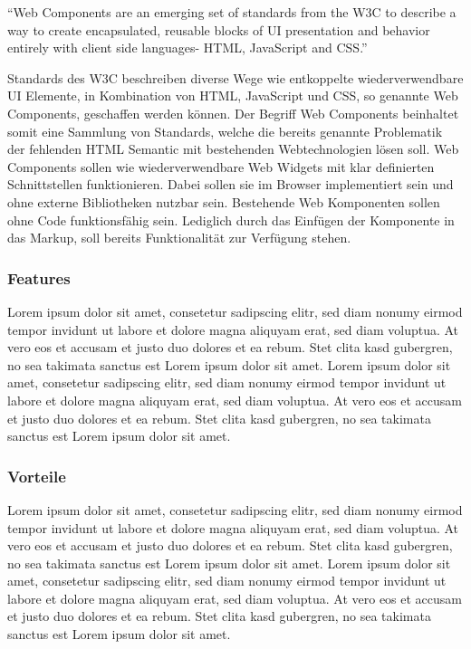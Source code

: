 ``Web Components are an emerging set of standards from the W3C to describe a way to create encapsulated,
reusable blocks of UI presentation and behavior entirely with client side languages- HTML, JavaScript and CSS.''
\cite[42]{Web-Component-Architecture}
\vspace{1cm}

Standards des W3C beschreiben diverse Wege wie entkoppelte wiederverwendbare UI Elemente,
in Kombination von HTML, JavaScript und CSS, so genannte Web Components, geschaffen werden können.
Der Begriff Web Components beinhaltet somit eine Sammlung von Standards,
welche die bereits genannte Problematik der fehlenden HTML Semantic mit bestehenden Webtechnologien lösen soll.
Web Components sollen wie wiederverwendbare Web Widgets mit klar definierten Schnittstellen funktionieren.
Dabei sollen sie im Browser implementiert sein und ohne externe Bibliotheken nutzbar sein.
Bestehende Web Komponenten sollen ohne Code funktionsfähig sein. Lediglich durch das Einfügen der Komponente in das Markup,
soll bereits Funktionalität zur Verfügung stehen.
\cite[42]{Web-Component-Architecture}

\subsubsection{Features}
Lorem ipsum dolor sit amet, consetetur sadipscing elitr, sed diam nonumy eirmod tempor invidunt ut labore et dolore magna aliquyam erat, sed diam voluptua. At vero eos et accusam et justo duo dolores et ea rebum. Stet clita kasd gubergren, no sea takimata sanctus est Lorem ipsum dolor sit amet. Lorem ipsum dolor sit amet, consetetur sadipscing elitr, sed diam nonumy eirmod tempor invidunt ut labore et dolore magna aliquyam erat, sed diam voluptua. At vero eos et accusam et justo duo dolores et ea rebum. Stet clita kasd gubergren, no sea takimata sanctus est Lorem ipsum dolor sit amet.

\subsubsection{Vorteile}
Lorem ipsum dolor sit amet, consetetur sadipscing elitr, sed diam nonumy eirmod tempor invidunt ut labore et dolore magna aliquyam erat, sed diam voluptua. At vero eos et accusam et justo duo dolores et ea rebum. Stet clita kasd gubergren, no sea takimata sanctus est Lorem ipsum dolor sit amet. Lorem ipsum dolor sit amet, consetetur sadipscing elitr, sed diam nonumy eirmod tempor invidunt ut labore et dolore magna aliquyam erat, sed diam voluptua. At vero eos et accusam et justo duo dolores et ea rebum. Stet clita kasd gubergren, no sea takimata sanctus est Lorem ipsum dolor sit amet.

